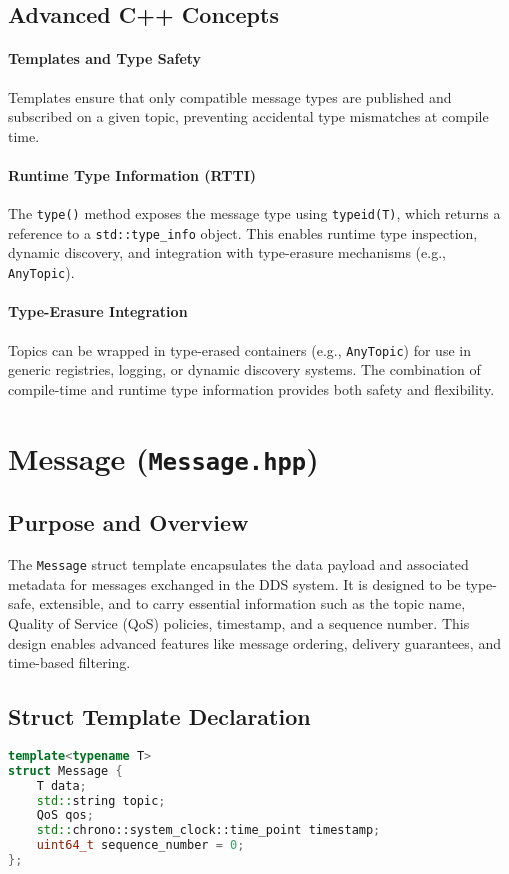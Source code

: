 \documentclass[12pt]{report}
\begin{document}
\subsection{Advanced C++ Concepts}
\paragraph{Templates and Type Safety}
Templates ensure that only compatible message types are published and subscribed on a given topic, preventing accidental type mismatches at compile time.

\paragraph{Runtime Type Information (RTTI)}
The \texttt{type()} method exposes the message type using \texttt{typeid(T)}, which returns a reference to a \texttt{std::type\_info} object. This enables runtime type inspection, dynamic discovery, and integration with type-erasure mechanisms (e.g., \texttt{AnyTopic}).

\paragraph{Type-Erasure Integration}
Topics can be wrapped in type-erased containers (e.g., \texttt{AnyTopic}) for use in generic registries, logging, or dynamic discovery systems. The combination of compile-time and runtime type information provides both safety and flexibility.

\section{Message (\texttt{Message.hpp})}

\subsection{Purpose and Overview}
The \texttt{Message} struct template encapsulates the data payload and associated metadata for messages exchanged in the DDS system. It is designed to be type-safe, extensible, and to carry essential information such as the topic name, Quality of Service (QoS) policies, timestamp, and a sequence number. This design enables advanced features like message ordering, delivery guarantees, and time-based filtering.

\subsection{Struct Template Declaration}
\begin{lstlisting}[language=C++]
template<typename T>
struct Message {
    T data;
    std::string topic;
    QoS qos;
    std::chrono::system_clock::time_point timestamp;
    uint64_t sequence_number = 0;
};
\end{lstlisting}
\end{document}
